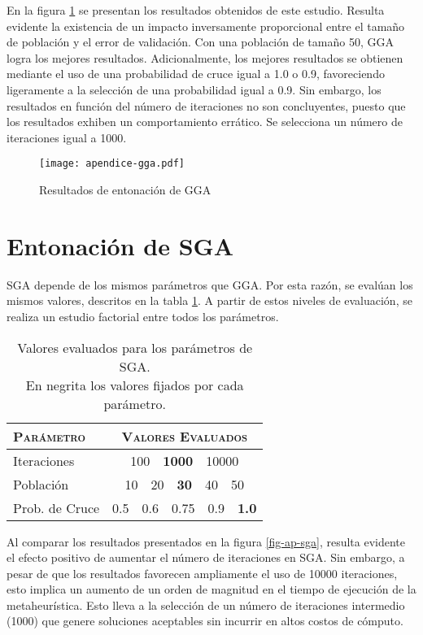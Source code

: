 En la figura \ref{fig-ap-gga} se presentan los resultados obtenidos de este estudio. Resulta evidente la existencia de un impacto inversamente proporcional entre el tamaño de población y el error de validación. Con una población de tamaño 50, GGA logra los mejores resultados.
Adicionalmente, los mejores resultados se obtienen mediante el uso de una probabilidad de cruce igual a 1.0 o 0.9, favoreciendo ligeramente a la selección de una probabilidad igual a 0.9.
Sin embargo, los resultados en función del número de iteraciones no son concluyentes, puesto que los resultados exhiben un comportamiento errático. Se selecciona un número de iteraciones igual a 1000.

\begin{figure}[h!]
\centering
\texttt{[image: apendice-gga.pdf]}
\caption{Resultados de entonación de GGA}
\label{fig-ap-gga}
\end{figure}

\section{Entonación de SGA}

SGA depende de los mismos parámetros que GGA. Por esta razón, se evalúan los mismos valores, descritos en la tabla \ref{table-ap-sga}. A partir de estos niveles de evaluación, se realiza un estudio factorial entre todos los parámetros.

\begin{table}[h!]
\centering
\begin{tabular}{l c}
\hline
\textsc{Parámetro} & \textsc{Valores Evaluados} \\
\hline
\hline
Iteraciones & 100\ \ \textbf{1000}\ \ 10000 \\
Población   & 10\ \ 20\ \ \textbf{30}\ \ 40\ \ 50 \\
Prob. de Cruce & 0.5\ \ 0.6\ \ 0.75\ \ 0.9\ \ \textbf{1.0}\\
\hline
\end{tabular}
\caption[Valores evaluados para los parámetros de SGA]{Valores evaluados para los parámetros de SGA.\\En negrita los valores fijados por cada parámetro.}
\label{table-ap-sga}
\end{table}

Al comparar los resultados presentados en la figura \ref{fig-ap-sga}, resulta evidente el efecto positivo de aumentar el número de iteraciones en SGA. Sin embargo, a pesar de que los resultados favorecen ampliamente el uso de 10000 iteraciones, esto implica un aumento de un orden de magnitud en el tiempo de ejecución de la metaheurística. Esto lleva a la selección de un número de iteraciones intermedio (1000) que genere soluciones aceptables sin incurrir en altos costos de cómputo.

